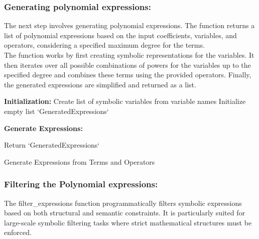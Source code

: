 \documentclass{article}
\begin{document}
\subsubsection{Generating polynomial expressions:}

The next step involves generating polynomial expressions. The function returns a list of polynomial expressions based on the input coefficients, variables, and operators, considering a specified maximum degree for the terms.\\

The function works by first creating symbolic representations for the variables. It then iterates over all possible combinations of powers for the variables up to the specified degree and combines these terms using the provided operators. Finally, the generated expressions are simplified and returned as a list.\\



\begin{algorithm}[H]
\SetAlgoLined
{}

\textbf{Initialization:}\;
Create list of symbolic variables from variable names\;
Initialize empty list `GeneratedExpressions`\;

\textbf{Generate Expressions:}\;

Return `GeneratedExpressions`\;

\caption{Generate Expressions from Terms and Operators}
\label{alg:generate_expressions_terms} %
\end{algorithm}




\subsubsection{Filtering the Polynomial expressions:}

The filter_expressions function programmatically filters symbolic expressions based on both structural and semantic constraints. It is particularly suited for large-scale symbolic filtering tasks where strict mathematical structures must be enforced.\\
\end{document}
